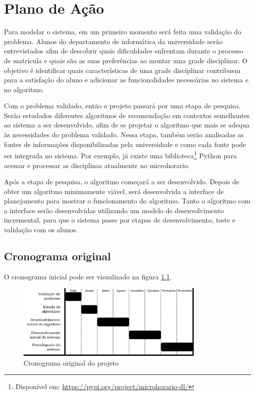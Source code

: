 
\chapter{Plano de Ação}
\label{cha:Plano de Ação}

Para modelar o sistema, em um primeiro momento será feita uma validação do problema. Alunos do departamento de informática da universidade serão entrevistados afim de descobrir quais dificuldades enfrentam durante o processo de matrícula e quais são as suas preferências ao montar uma grade disciplinar. O objetivo é identificar quais características de uma grade disciplinar contribuem para a satisfação do aluno e adicionar as funcionalidades necessárias no sistema e no algoritmo.

Com o problema validado, então o projeto passará por uma etapa de pesquisa. 
Serão estudados diferentes algoritmos de recomendação em contextos semelhantes ao sistema a ser desenvolvido, afim de se projetar o algoritmo que mais se adequa às necessidades do problema validado. 
Nessa etapa, também serão analisadas as fontes de informações disponibilizadas pela universidade e como cada fonte pode ser integrada no sistema. 
Por exemplo, já existe uma biblioteca\footnote{Dispon\'ivel em: \url{https://pypi.org/project/microhorario-dl/}} Python para acessar e processar as disciplinas atualmente no microhorario.

Após a etapa de pesquisa, o algoritmo começará a ser desenvolvido. 
Depois de obter um algoritmo minimamente viável, será desenvolvida a interface de planejamento para mostrar o funcionamento do algoritmo. 
Tanto o algoritmo com a interface serão desenvolvidas utilizando um modelo de desenvolvimento incremental, para que o sistema passe por etapas de desenvolvimento, teste e validação com os alunos. 

\section{Cronograma original}

O cronograma inicial pode ser visualizado na figura \ref{fig-cronograma}.

\begin{figure}[ht!]
    \begin{center}
    \includegraphics[width=260pt]{figuras/cronograma}
    \caption{Cronograma original do projeto}
    \label{fig-cronograma}
    \end{center}
\end{figure}

